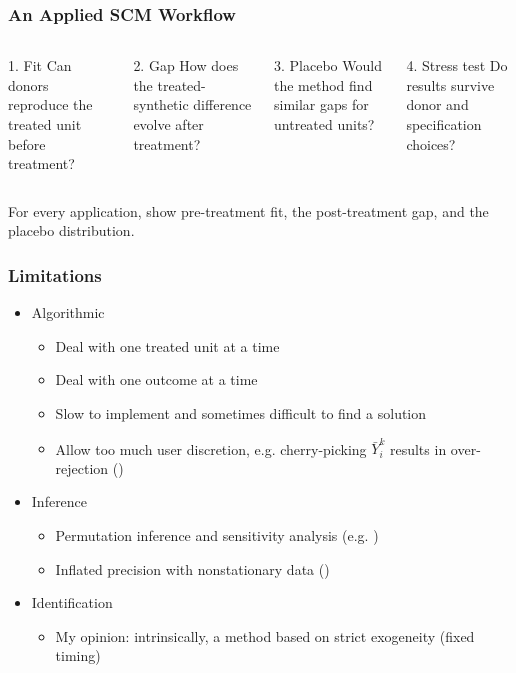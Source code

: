 \documentclass[xcolor=svgnames,9pt,english,t, aspectratio=169]{beamer}
\begin{document}

\begin{frame}
\frametitle{An Applied SCM Workflow}
\vspace{1.4em}
\begin{columns}[T]
\begin{block}{1. Fit}
Can donors reproduce the treated unit before treatment?
\end{block}
\begin{block}{2. Gap}
How does the treated-synthetic difference evolve after treatment?
\end{block}
\begin{block}{3. Placebo}
Would the method find similar gaps for untreated units?
\end{block}
\begin{block}{4. Stress test}
Do results survive donor and specification choices?
\end{block}
\end{columns}
\bigskip
For every application, show pre-treatment fit, the post-treatment gap, and the placebo distribution.
\end{frame}


\begin{frame}
 \frametitle{Limitations}
\begin{itemize}\itemsep1em
\item Algorithmic
\begin{itemize}
\item Deal with one treated unit at a time
\item Deal with one outcome at a time
\item Slow to implement and sometimes difficult to find a solution \pause
\item Allow too much user discretion, e.g. cherry-picking $\bar Y_{i}^{k}$ results in over-rejection ()\pause
\end{itemize}
\item Inference
\begin{itemize}
\item Permutation inference and sensitivity analysis (e.g. {}) \pause
\item Inflated precision with nonstationary data ()\pause
\end{itemize}
\item Identification
\begin{itemize}
\item My opinion: intrinsically, a method based on strict exogeneity (fixed timing)
\end{itemize}
\end{itemize}
\end{frame}
\end{document}
